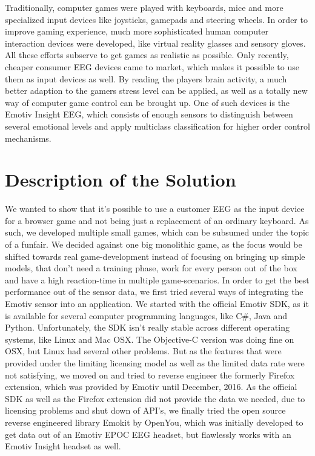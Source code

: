 \documentclass{utue} %
\begin{document}
Traditionally, computer games were played with keyboards, mice and more specialized input devices like joysticks, gamepads and steering wheels. In order to improve gaming experience, much more sophisticated human computer interaction devices were developed, like virtual reality glasses and sensory gloves. All these efforts subserve to get games as realistic as possible. Only recently, cheaper consumer EEG devices came to market, which makes it possible to use them as input devices as well. By reading the players brain activity, a much better adaption to the gamers stress level can be applied, as well as a totally new way of computer game control can be brought up. One of such devices is the Emotiv Insight EEG, which consists of enough sensors to distinguish between several emotional levels and apply multiclass classification for higher order control mechanisms. 


\section{Description of the Solution}

We wanted to show that it's possible to use a customer EEG as the input device for a browser game and not being just a replacement of an ordinary keyboard. As such, we developed multiple small games, which can be subsumed under the topic of a funfair. We decided against one big monolithic game, as the focus would be shifted towards real game-development instead of focusing on bringing up simple models, that don't need a training phase, work for every person out of the box and have a high reaction-time in multiple game-scenarios. In order to get the best performance out of the sensor data, we first tried several ways of integrating the Emotiv sensor into an application. We started with the official Emotiv SDK, as it is available for several computer programming languages, like C\#, Java and Python. Unfortunately, the SDK isn't really stable across different operating systems, like Linux and Mac OSX. The Objective-C version was doing fine on OSX, but Linux had several other problems. But as the features that were provided under the limiting licensing model as well as the limited data rate were not satisfying, we moved on and tried to reverse engineer the formerly Firefox extension, which was provided by Emotiv until December, 2016. As the official SDK as well as the Firefox extension did not provide the data we needed, due to licensing problems and shut down of API's, we finally tried the open source reverse engineered library Emokit by OpenYou, which was initially developed to get data out of an Emotiv EPOC EEG headset, but flawlessly works with an Emotiv Insight headset as well.
\end{document}
